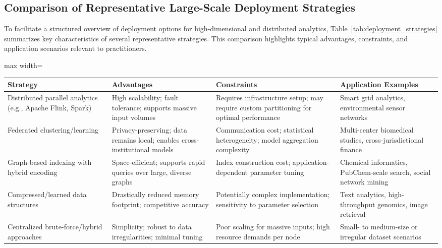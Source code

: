 \subsection{Comparison of Representative Large-Scale Deployment Strategies}

To facilitate a structured overview of deployment options for high-dimensional and distributed analytics, Table~\ref{tab:deployment_strategies} summarizes key characteristics of several representative strategies. This comparison highlights typical advantages, constraints, and application scenarios relevant to practitioners.

\begin{table*}[htbp]
\centering
\caption{Comparison of large-scale deployment strategies for clustering and analytics.}
\label{tab:deployment_strategies}
\begin{adjustbox}{max width=\textwidth}
\begin{tabular}{llll}
\toprule
\textbf{Strategy} & \textbf{Advantages} & \textbf{Constraints} & \textbf{Application Examples} \\
\midrule
Distributed parallel analytics (e.g., Apache Flink, Spark) & High scalability; fault tolerance; supports massive input volumes & Requires infrastructure setup; may require custom partitioning for optimal performance & Smart grid analytics, environmental sensor networks \\
Federated clustering/learning & Privacy-preserving; data remains local; enables cross-institutional models & Communication cost; statistical heterogeneity; model aggregation complexity & Multi-center biomedical studies, cross-jurisdictional finance \\
Graph-based indexing with hybrid encoding & Space-efficient; supports rapid queries over large, diverse graphs & Index construction cost; application-dependent parameter tuning & Chemical informatics, PubChem-scale search, social network mining \\
Compressed/learned data structures & Drastically reduced memory footprint; competitive accuracy & Potentially complex implementation; sensitivity to parameter selection & Text analytics, high-throughput genomics, image retrieval \\
Centralized brute-force/hybrid approaches & Simplicity; robust to data irregularities; minimal tuning & Poor scaling for massive inputs; high resource demands per node & Small- to medium-size or irregular dataset scenarios \\
\bottomrule
\end{tabular}
\end{adjustbox}
\end{table*}

